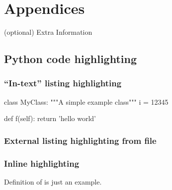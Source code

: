 \section{Appendices}
(optional) Extra Information

\subsection{Python code highlighting}

\subsubsection{``In-text'' listing highlighting}

\begin{python}
class MyClass:
    """A simple example class"""
    i = 12345

    def f(self):
        return 'hello world'
\end{python}

\subsubsection{External listing highlighting from file}


\subsubsection{Inline highlighting}

Definition of  is just an example.
